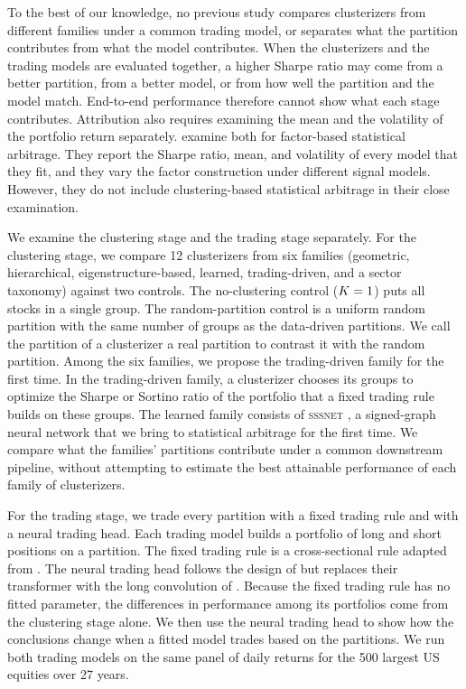 To the best of our knowledge, no previous study compares clusterizers from different families under a common trading model, or separates what the partition contributes from what the model contributes. When the clusterizers and the trading models are evaluated together, a higher Sharpe ratio may come from a better partition, from a better model, or from how well the partition and the model match. End-to-end performance therefore cannot show what each stage contributes. Attribution also requires examining the mean and the volatility of the portfolio return separately. \citet{guijarro2025deep} examine both for factor-based statistical arbitrage. They report the Sharpe ratio, mean, and volatility of every model that they fit, and they vary the factor construction under different signal models. However, they do not include clustering-based statistical arbitrage in their close examination.

We examine the clustering stage and the trading stage separately.
For the clustering stage, we compare 12 clusterizers from six families (geometric, hierarchical, eigenstructure-based, learned, trading-driven, and a sector taxonomy) against two controls.
The no-clustering control ($K=1$) puts all stocks in a single group. The random-partition control is a uniform random partition with the same number of groups as the data-driven partitions. We call the partition of a clusterizer a real partition to contrast it with the random partition. Among the six families, we propose the trading-driven family for the first time. In the trading-driven family, a clusterizer chooses its groups to optimize the Sharpe or Sortino ratio of the portfolio that a fixed trading rule builds on these groups. The learned family consists of \textsc{sssnet} \citep{he2022sssnet}, a signed-graph neural network that we bring to statistical arbitrage for the first time. We compare what the families' partitions contribute under a common downstream pipeline, without attempting to estimate the best attainable performance of each family of clusterizers.

For the trading stage, we trade every partition with a fixed trading rule and with a neural trading head. Each trading model builds a portfolio of long and short positions on a partition. The fixed trading rule is a cross-sectional rule adapted from \citet{Jinetal2023}. The neural trading head follows the design of \citet{guijarro2025deep} but replaces their transformer with the long convolution of \citet{fu2023simple}. Because the fixed trading rule has no fitted parameter, the differences in performance among its portfolios come from the clustering stage alone. We then use the neural trading head to show how the conclusions change when a fitted model trades based on the partitions. We run both trading models on the same panel of daily returns for the 500 largest US equities over 27 years.

